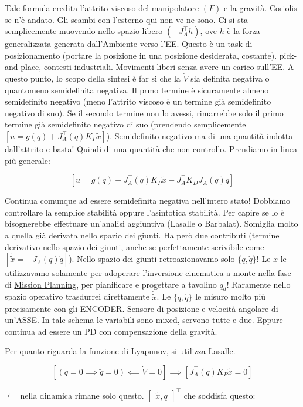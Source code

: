 Tale formula eredita l'attrito viscoso del manipolatore $(F)$ e la gravità. Coriolis se n'è andato. Gli scambi con l'esterno qui non ve ne sono. Ci si sta semplicemente muovendo nello spazio libero $(-J_A^\top h)$, ove $h$ è la forza generalizzata generata dall'Ambiente verso l'EE. Questo è un task di posizionamento (portare la posizione in una posizione desiderata, costante). pick-and-place, contesti industriali. Movimenti liberi senza avere un carico sull'EE. A questo punto, lo scopo della sintesi è far sì che la $\dot{V}$ sia definita negativa o quantomeno semidefinita negativa. Il prmo termine è sicuramente almeno semidefinito negativo (meno l'attrito viscoso è un termine già semidefinito negativo di suo). Se il secondo termine non lo avessi, rimarrebbe solo il primo termine già semidefinito negativo di suo (prendendo semplicemente $[u=g(q)+J_A^\top(q)K_P\tilde{x}]$). Semidefinito negativo ma di una quantità indotta dall'attrito e basta! Quindi di una quantità che non controllo. Prendiamo in linea più generale:

\[
	[u = g(q) + J_A^\top(q)K_P\tilde{x} - J_A^\top K_DJ_A(q)\dot{q}]
\]

Continua comunque ad essere semidefinita negativa nell'intero stato! Dobbiamo controllare la semplice stabilità oppure l'asintotica stabilità. Per capire se lo è bisognerebbe effettuare un'analisi aggiuntiva (Lasalle o Barbalat). Somiglia molto a quella già derivata nello spazio dei giunti. Ha però due contributi (termine derivativo nello spazio dei giunti, anche se perfettamente scrivibile come $[\dot{\tilde{x}}=-J_A(q)\dot{q}]$). Nello spazio dei giunti retroazionavamo solo $\{q,\dot{q}\}$! Le $x$ le utilizzavamo solamente per adoperare l'inversione cinematica a monte nella fase di \underline{Mission Planning}, per pianificare e progettare a tavolino $q_d$! Raramente nello spazio operativo trasdurrei direttamente $\dot{\tilde{x}}$. Le $\{q,\dot{q}\}$ le misuro molto più precisamente con gli ENCODER. Sensore di posizione e velocità angolare di un'ASSE. In tale schema le variabili sono mixed, servono tutte e due. Eppure continua ad essere un PD con compensazione della gravità. 

Per quanto riguarda la funzione di Lyapunov, si utilizza Lasalle.

\[
	[(\dot{q}=0\implies\ddot{q}=0)\impliedby \dot{V}=0] \implies [J_A^\top(q)K_P\tilde{x}=0]
\]

$\leftarrow$ nella dinamica rimane solo questo. $\begin{bmatrix}\tilde{x},q\end{bmatrix}^\top$ che soddisfa questo:

